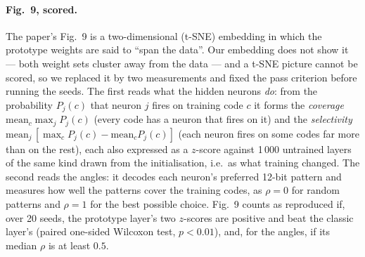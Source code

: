 \paragraph{Fig.~9, scored.}
The paper's Fig.~9 is a two-dimensional (t-SNE) embedding in which the prototype weights are
said to ``span the data''.  Our embedding does not show it --- both weight sets cluster away
from the data --- and a t-SNE picture cannot be scored, so we replaced it by two measurements and
fixed the pass criterion before running the seeds.  The first reads what the hidden neurons
\emph{do}: from the probability $P_j(c)$ that neuron $j$ fires on training code $c$ it forms the
\emph{coverage} $\mathrm{mean}_c \max_j P_j(c)$ (every code has a neuron that fires on it) and
the \emph{selectivity} $\mathrm{mean}_j\,[\max_c P_j(c) - \mathrm{mean}_c P_j(c)]$ (each neuron
fires on some codes far more than on the rest), each also expressed as a $z$-score against
1\,000 untrained layers of the same kind drawn from the initialisation, i.e.\ as what training
changed.  The second reads the angles: it decodes each
neuron's preferred 12-bit pattern and measures how well the patterns cover the training codes,
as $\rho = 0$ for random patterns and $\rho = 1$ for the best possible choice.  Fig.~9 counts as
reproduced if, over 20 seeds, the prototype layer's two $z$-scores are positive and beat
the classic layer's (paired one-sided Wilcoxon test, $p < 0.01$), and, for the angles, if
its median $\rho$ is at least $0.5$.

